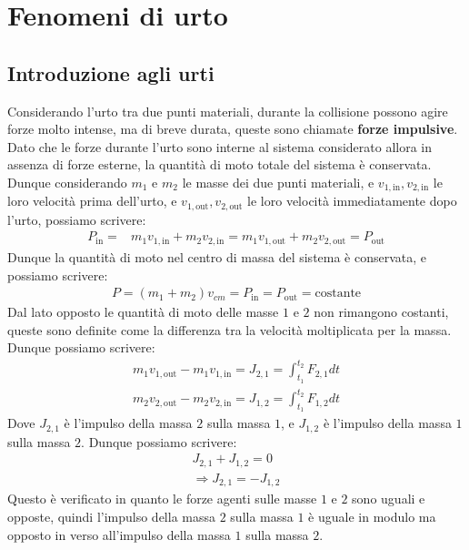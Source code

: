 \chapter{Fenomeni di urto}
\label{cap:fenomeniUrto}

\section{Introduzione agli urti}
    Considerando l'urto tra due punti materiali, durante la collisione possono agire forze molto intense, ma di breve durata, queste sono chiamate \textbf{forze impulsive}. Dato che le forze durante l'urto sono interne al sistema considerato allora in assenza di forze esterne, la quantità di moto totale del sistema è conservata. Dunque considerando $m_1$ e $m_2$ le masse dei due punti materiali, e $v_{1,\text{in}}, v_{2,\text{in}}$ le loro velocità prima dell'urto, e $v_{1,\text{out}}, v_{2,\text{out}}$ le loro velocità immediatamente dopo l'urto, possiamo scrivere:
    \begin{align*}
        P_{\text{in}} = & m_1v_{1,\text{in}} + m_2v_{2,\text{in}} = m_1v_{1,\text{out}} + m_2v_{2,\text{out}} = P_{\text{out}}
    \end{align*}
    Dunque la quantità di moto nel centro di massa del sistema è conservata, e possiamo scrivere:
    \begin{align}
        P=(m_1+m_2)v_{cm} = P_{\text{in}} = P_{\text{out}} = \text{costante}
    \end{align}
    Dal lato opposto le quantità di moto delle masse $1$ e $2$ non rimangono costanti, queste sono definite come la differenza tra la velocità moltiplicata per la massa. Dunque possiamo scrivere:
    \begin{align*}
        m_1v_{1,\text{out}} - m_1v_{1,\text{in}} = J_{2,1} = \int_{t_1}^{t_2} F_{2,1} dt\\
        m_2v_{2,\text{out}} - m_2v_{2,\text{in}} = J_{1,2} = \int_{t_1}^{t_2} F_{1,2} dt
    \end{align*}
    Dove $J_{2,1}$ è l'impulso della massa $2$ sulla massa $1$, e $J_{1,2}$ è l'impulso della massa $1$ sulla massa $2$. Dunque possiamo scrivere:
    \begin{align*}
        J_{2,1} + J_{1,2} = 0\\
        \Rightarrow J_{2,1} = -J_{1,2}
    \end{align*}
    Questo è verificato in quanto le forze agenti sulle masse $1$ e $2$ sono uguali e opposte, quindi l'impulso della massa $2$ sulla massa $1$ è uguale in modulo ma opposto in verso all'impulso della massa $1$ sulla massa $2$.\newline
